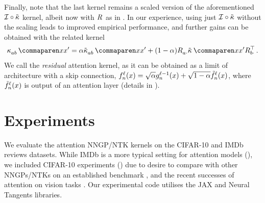 \documentclass{article}
\begin{document}
Finally, note that the last kernel remains a scaled version of the aforementioned $\mathcal{I} \circ \tilde{\kappa}$ kernel, albeit now with $R_{}^{}$ as in .
In our experience, using just $\mathcal{I} \circ \tilde{\kappa}$ without the scaling leads to improved empirical performance, and further gains can be obtained with the related kernel
\begin{align}\label{eq:residual_kernel}
    \kernelf{a b }{}{\inputSymbol}{\inputSymbol'}
    =
    \interpKernCoeff \kerntildef{a b}{}{\inputSymbol}{\inputSymbol'}
    +
    (1 - \interpKernCoeff)
    \covPosEmb{a \cdot}{}
    \kerntildef{}{}{\inputSymbol}{\inputSymbol'}
    \covPosEmb{b \cdot}{\top}
    \, .
\end{align}
We call  the \emph{residual} attention kernel, as it can be obtained as a limit of architecture with a skip connection, ${f}^{\ell}_{n}{(x)} = \sqrt{\alpha} {g}^{\ell - 1}_{n}{(x)} + \sqrt{1 - \alpha} {\tilde{f}}^{\ell}_{n}{(x)}$, where ${\tilde{f}}^{\ell}_{n}{(x)}$ is output of an attention layer (details in ).


\section{Experiments}

We evaluate the attention NNGP/NTK kernels on the CIFAR-10 \citep{cifar10} and IMDb reviews \citep{maas2011learning} datasets.
While IMDb is a more typical setting for attention models (), we included CIFAR-10 experiments () due to desire to compare with other NNGPs/NTKs on an established benchmark \citep[e.g.,][]{novak2019bayesian,du2019gd,li2019enhanced}, 
and the recent successes of attention on vision tasks \citep[e.g.,][]{wang2017residual,wang2018non,hu2018squeeze,woo2018cbam,chen2018,ramachandran2018stand,bello2019attention}.
Our experimental code utilises the JAX \citep{jax2018github} and Neural Tangents \citep{novak2020neural} libraries.
\end{document}
